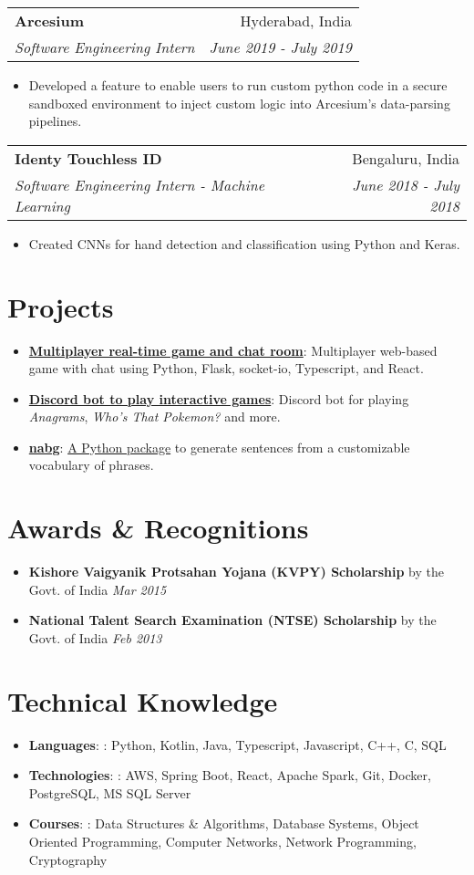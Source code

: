 \documentclass[a4paper,11pt]{article}
\makeatletter
\newcommand{\resumeItem}[2]{
  \item\small{
    \textbf{#1}{: #2 \vspace{-1pt}}
  }
}
\newcommand{\resumeItemNoTitle}[1]{
  \item\small{
    {#1 \vspace{-1pt}}
  }
}
\newcommand{\resumeItemDate}[3]{
  \item\small{
    \textbf{#1}{ #2 \vspace{-1pt}} \hfill \textit{\small #3}
  }
}
\newcommand{\resumeSubheading}[4]{
  \vspace{10pt}
    \begin{tabular*}{0.97\textwidth}{l@{\extracolsep{\fill}}r}
      \textbf{#1} & #2 \\
      \textit{\small#3} & \textit{\small #4} \\
    \end{tabular*}\vspace{-1pt}
}
\newcommand{\resumeItemListStart}{\begin{itemize}}
\newcommand{\resumeItemListEnd}{\end{itemize}\vspace{-2pt}}
\makeatother
\begin{document}
\resumeSubheading
{Arcesium}{Hyderabad, India}
{Software Engineering Intern}{June 2019 - July 2019}
\resumeItemListStart
\resumeItemNoTitle{Developed a feature to enable users to run custom python code in a secure sandboxed environment to inject custom logic into Arcesium's data-parsing pipelines.}
\resumeItemListEnd

\resumeSubheading
{Identy Touchless ID}{Bengaluru, India}
{Software Engineering Intern - Machine Learning}{June 2018 - July 2018}
\resumeItemListStart
\resumeItemNoTitle{Created CNNs for hand detection and classification using Python and Keras.}
\resumeItemListEnd


\section{Projects}
\resumeItemListStart
\resumeItem{\href{https://github.com/naveen-u/lets-play}{Multiplayer real-time game and chat room}}
{Multiplayer web-based game with chat using Python, Flask, socket-io, Typescript, and React.}
\resumeItem{\href{https://github.com/naveen-u/WingBot}{Discord bot to play interactive games}}
{Discord bot for playing \textit{Anagrams}, \textit{Who's That Pokemon?} and more.}
\resumeItem{\href{https://github.com/naveen-u/nabg}{nabg}}
{\href{https://pypi.org/project/nabg/}{A Python package} to generate sentences from a customizable vocabulary of phrases.}
\resumeItemListEnd


\section{Awards \& Recognitions}
\resumeItemListStart
\resumeItemDate{Kishore Vaigyanik Protsahan Yojana (KVPY) Scholarship}{by the Govt. of India}{Mar 2015}
\resumeItemDate{National Talent Search Examination (NTSE) Scholarship}{by the Govt. of India}{Feb 2013}
\resumeItemListEnd

\section{Technical Knowledge}
\resumeItemListStart
\resumeItem{Languages}{: Python, Kotlin, Java, Typescript, Javascript, C++, C, SQL}
\resumeItem{Technologies}{: AWS, Spring Boot, React, Apache Spark, Git, Docker, PostgreSQL, MS SQL Server}
\resumeItem{Courses}{: Data Structures \& Algorithms, Database Systems, Object Oriented Programming, Computer Networks, Network Programming, Cryptography}
\resumeItemListEnd

\end{document}
